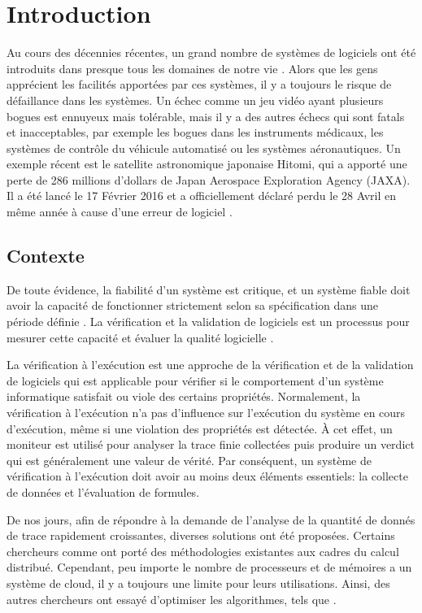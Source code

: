 
\chapter{Introduction}

Au cours des décennies récentes, un grand nombre de systèmes de logiciels ont été introduits dans presque tous les domaines de notre vie \citep{clarke1999model}. Alors que les gens apprécient les facilités apportées par ces systèmes, il y a toujours le risque de défaillance dans les systèmes. Un échec comme un jeu vidéo ayant plusieurs bogues est ennuyeux mais tolérable, mais il y a des autres échecs qui sont fatals et inacceptables, par exemple les bogues dans les instruments médicaux, les systèmes de contrôle du véhicule automatisé ou les systèmes aéronautiques. Un exemple récent est le satellite astronomique japonaise Hitomi, qui a apporté une perte de 286 millions d'dollars de Japan Aerospace Exploration Agency (JAXA). Il a été lancé le 17 Février 2016 et a officiellement déclaré perdu le 28 Avril en même année à cause d'une erreur de logiciel \citep{nature2016}.

\section{Contexte}

De toute évidence, la fiabilité d'un système est critique, et un système fiable doit avoir la capacité de fonctionner strictement selon sa spécification dans une période définie \citep{avivzienis2004basic}. La vérification et la validation de logiciels est un processus pour mesurer cette capacité et évaluer la qualité logicielle \citep{ieeestd2012}.

La vérification à l'exécution \citep{leucker2009brief} est une approche de la vérification et de la validation de logiciels qui est applicable pour vérifier si le comportement d'un système informatique satisfait ou viole des certains propriétés. Normalement, la vérification à l'exécution n'a pas d'influence sur l'exécution du système en cours d'exécution, même si une violation des propriétés est détectée. À cet effet, un moniteur est utilisé pour analyser la trace finie collectées puis produire un verdict qui est généralement une valeur de vérité. Par conséquent, un système de vérification à l'exécution doit avoir au moins deux éléments essentiels: la collecte de données et l'évaluation de formules.

De nos jours, afin de répondre à la demande de l'analyse de la quantité de donnés de trace rapidement croissantes, diverses solutions ont été proposées. Certains chercheurs comme \cite{barre2012mapreduce} ont porté des méthodologies existantes aux cadres du calcul distribué. Cependant, peu importe le nombre de processeurs et de mémoires a un système de cloud, il y a toujours une limite pour leurs utilisations. Ainsi, des autres chercheurs ont essayé d'optimiser les algorithmes, tels que \cite{havelund2001monitoring}.

